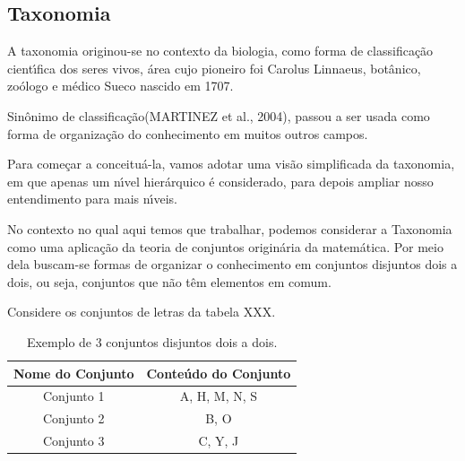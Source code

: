 \documentclass[
12pt,		%
openright,	%
twoside,  %
a4paper,			%
chapter=TITLE,		%
english,			%
french,				%
spanish,			%
brazil				%
]{USPSC-classe/USPSC}
\begin{document}
\subsection[Taxonomia]{Taxonomia}\label{Taxonomia}
A taxonomia originou-se no contexto da biologia, como forma de classifica\c{c}\~ao cient\'{\i}fica dos seres vivos, \'area cujo pioneiro foi Carolus Linnaeus, bot\^anico, zo\'ologo e m\'edico Sueco nascido em 1707.










Sin\^onimo de \textquotedbl classifica\c{c}\~ao\textquotedbl   (MARTINEZ et al., 2004), passou a ser usada como forma de organiza\c{c}\~ao do conhecimento em muitos outros campos.










Para come\c{c}ar a conceitu\'a-la, vamos adotar uma vis\~ao simplificada da taxonomia, em que apenas um n\'{\i}vel hier\'arquico \'e considerado, para depois ampliar nosso entendimento para mais n\'{\i}veis.










No contexto no qual aqui temos que trabalhar, podemos considerar a Taxonomia como uma aplica\c{c}\~ao da teoria de conjuntos origin\'aria da matem\'atica. Por meio dela buscam-se formas de organizar o conhecimento em \textquotedbl conjuntos disjuntos dois a dois\textquotedbl , ou seja, conjuntos que n\~ao t\^em elementos em comum.










Considere os conjuntos de letras da tabela XXX.














\begin{table}[htb]
\tiny
\caption{\label{44490fe2b906078abd65fafd043ad29728406f42}Exemplo de 3 conjuntos disjuntos dois a dois.}

\centering
\begin{tabular}{|c|c|}
\hline
Nome do Conjunto  &  Conte\'udo do Conjunto \\
\hline
Conjunto 1  &  A, H, M, N, S \\
Conjunto 2  &  B, O \\
Conjunto 3  &  C, Y, J \\
\hline
\end{tabular}
\end{table}
\end{document}
